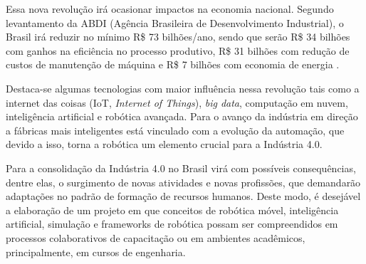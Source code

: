 Essa nova revolução irá ocasionar impactos na economia nacional. Segundo levantamento da ABDI (Agência Brasileira de Desenvolvimento Industrial), o Brasil irá reduzir no mínimo R\$ 73 bilhões/ano, sendo que serão R\$ 34 bilhões com ganhos na eficiência no processo produtivo, R\$ 31 bilhões com redução de custos de manutenção de máquina e  R\$ 7 bilhões com economia de energia \cite{abdi}.

Destaca-se algumas tecnologias com maior influência nessa revolução tais como a internet das coisas (IoT, \textit{Internet of Things}), \textit{big data}, computação em nuvem, inteligência artificial e robótica avançada. Para  o avanço da indústria em direção a fábricas mais inteligentes está vinculado com a evolução da automação, que devido a isso, torna a robótica um elemento crucial para a Indústria 4.0.

Para  a consolidação da Indústria 4.0 no Brasil virá com possíveis consequências, dentre elas, o surgimento de novas atividades e novas profissões, que demandarão adaptações no padrão de formação de recursos humanos. Deste modo, é desejável a elaboração de um projeto em que conceitos de robótica móvel, inteligência artificial, simulação e frameworks de robótica possam ser compreendidos em processos colaborativos de capacitação ou em ambientes acadêmicos, principalmente, em cursos de engenharia.       

\begin{comment}
\section{Organização do trabalho}
\label{section:organizacao}

Este documento apresenta $5$ capítulos e está estruturado da seguinte forma:

\begin{itemize}

  \item \textbf{Capítulo \ref{chap:intro} - Introdução}: Contextualiza o âmbito, no qual a pesquisa proposta está inserida. Apresenta, portanto, a definição do problema, objetivos e justificativas da pesquisa e como este \thetypeworkthree está estruturado;
  \item \textbf{Capítulo \ref{chap:fundteor} - Fundamentação Teórica}: XXX;
  \item \textbf{Capítulo \ref{chap:mat} - Materiais e Métodos}: XXX;
  \item \textbf{Capítulo \ref{chap:result} - Resultados}: XXX;
  \item \textbf{Capítulo \ref{chap:conc} - Conclusão}: Apresenta as conclusóes, contribuições e algumas sugestões de atividades de pesquisa a serem desenvolvidas no futuro.

\end{itemize}
\end{comment}
